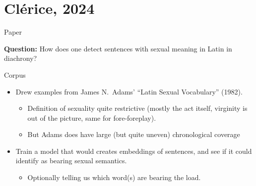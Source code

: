 \documentclass[aspectratio=169]{beamer}
\begin{document}
\section{Clérice, 2024}

\begin{frame}{Paper}
    
    
    \vspace{1em}
   \textbf{Question:} How does one detect sentences with sexual meaning in Latin in diachrony?
\end{frame}

\begin{frame}{Corpus}
    \begin{itemize}
        \item Drew examples from James N.~Adams' ``Latin Sexual Vocabulary'' (1982).
        \begin{itemize}
            \item Definition of sexuality quite restrictive (mostly the act itself, virginity is out of the picture, same for fore-foreplay).
            \item But Adams does have large (but quite uneven) chronological coverage
        \end{itemize}
        \item Train a model that would creates embeddings of sentences, and see if it could identify as bearing sexual semantics.
        \begin{itemize}
            \item Optionally telling us which word(s) are bearing the load.
        \end{itemize}
    \end{itemize}
\end{frame}
\end{document}
